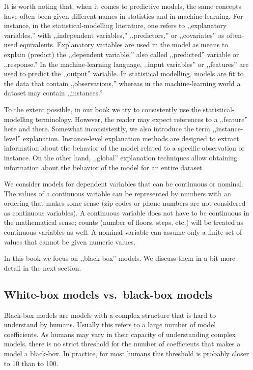 \documentclass[]{krantz}
\theoremstyle{definition}
\theoremstyle{definition}
\theoremstyle{definition}
\theoremstyle{remark}
\begin{document}
It is worth noting that, when it comes to predictive models, the same
concepts have often been given different names in statistics and in
machine learning. For instance, in the statistical-modelling literature,
one refers to ,,explanatory variables,'' with ,,independent variables,''
,,predictors,'' or ,,covariates'' as often-used equivalents. Explanatory
variables are used in the model as means to explain (predict) the
,,dependent variable,'' also called ,,predicted'' variable or
,,response.'' In the machine-learning language, ,,input variables'' or
,,features'' are used to predict the ,,output'' variable. In statistical
modelling, models are fit to the data that contain ,,observations,''
whereas in the machine-learning world a dataset may contain
,,instances.''

To the extent possible, in our book we try to consistently use the
statistical-modelling terminology. However, the reader may expect
references to a ,,feature'' here and there. Somewhat inconsistently, we
also introduce the term ,,instance-level'' explanation. Instance-level
explanation methods are designed to extract information about the
behavior of the model related to a specific observation or instance. On
the other hand, ,,global'' explanation techniques allow obtaining
information about the behavior of the model for an entire dataset.

We consider models for dependent variables that can be continuous or
nominal. The values of a continuous variable can be represented by
numbers with an ordering that makes some sense (zip codes or phone
numbers are not considered as continuous variables). A continuous
variable does not have to be continuous in the mathematical sense;
counts (number of floors, steps, etc.) will be treated as continuous
variables as well. A nominal variable can assume only a finite set of
values that cannot be given numeric values.

In this book we focus on ,,black-box'' models. We discuss them in a bit
more detail in the next section.

\hypertarget{white-box-models-vs.black-box-models}{%
\subsection{White-box models vs.~black-box
models}\label{white-box-models-vs.black-box-models}}

Black-box models are models with a complex structure that is hard to
understand by humans. Usually this refers to a large number of model
coefficients. As humans may vary in their capacity of understanding
complex models, there is no strict threshold for the number of
coefficients that makes a model a black-box. In practice, for most
humans this threshold is probably closer to 10 than to 100.
\end{document}
